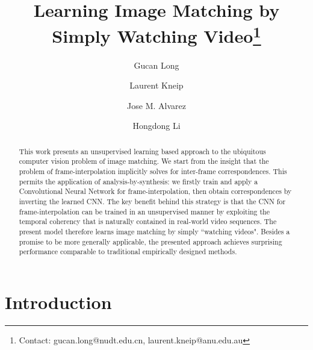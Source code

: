 \documentclass[runningheads]{llncs}
\begin{document}
\pagestyle{headings}
\mainmatter

\title{Learning Image Matching by\\Simply Watching Video\thanks{Contact: gucan.long@nudt.edu.cn, laurent.kneip@anu.edu.au}} %




\author{
Gucan Long 
\and Laurent Kneip
\and Jose M. Alvarez
\and Hongdong Li
}


\maketitle

\begin{abstract}

This work presents an unsupervised learning based approach to the ubiquitous computer vision problem of image matching. We start from the insight that the problem of frame-interpolation implicitly solves for inter-frame correspondences. This permits the application of analysis-by-synthesis: we firstly train and apply a Convolutional Neural Network for frame-interpolation, then obtain correspondences by inverting the learned CNN. The key benefit behind this strategy is that the CNN for frame-interpolation can be trained in an unsupervised manner by exploiting the temporal coherency that is naturally contained in real-world video sequences. The present model therefore learns image matching by simply ``watching videos". Besides a promise to be more generally applicable, the presented approach achieves surprising performance comparable to traditional empirically designed methods.

\end{abstract}


\section{Introduction}
\end{document}
